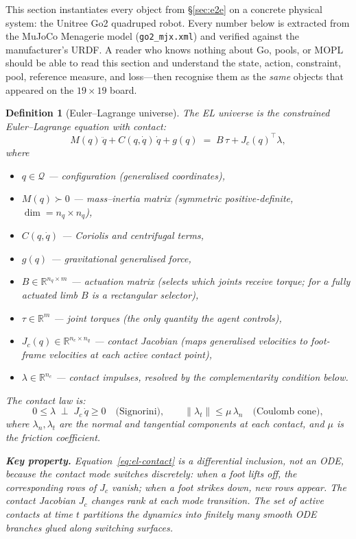 \documentclass[11pt,a4paper]{article}
\newtheorem{definition}[theorem]{Definition}
\newcommand{\R}{\mathbb{R}}
\newcommand{\norm}[1]{\lVert #1 \rVert}
\begin{document}
This section instantiates every object from
\S\ref{sec:e2e}
on a concrete physical system:
the Unitree Go2 quadruped robot.
Every number below is extracted from the
MuJoCo Menagerie model (\texttt{go2\_mjx.xml})
and verified against the manufacturer's URDF.
A reader who knows nothing about Go, pools, or MOPL
should be able to read this section and
understand the state, action, constraint, pool,
reference measure, and loss---then recognise them
as the \emph{same} objects that appeared on the $19\times 19$ board.


\begin{definition}[Euler--Lagrange universe]
\label{def:el-universe}
The \emph{EL universe} is the constrained
Euler--Lagrange equation with contact:
\begin{equation}\label{eq:el-contact}
  M(q)\,\ddot{q}
  + C(q,\dot{q})\,\dot{q}
  + g(q)
  \;=\;
  B\,\tau
  + J_c(q)^{\!\top}\lambda,
\end{equation}
where
\begin{itemize}[nosep]
\item $q \in \mathcal{Q}$ --- configuration
      (generalised coordinates),
\item $M(q) \succ 0$ --- mass--inertia matrix
      (symmetric positive-definite, $\dim = n_q \times n_q$),
\item $C(q,\dot{q})$ --- Coriolis and centrifugal terms,
\item $g(q)$ --- gravitational generalised force,
\item $B \in \R^{n_q \times m}$ --- actuation matrix
      (selects which joints receive torque;
       for a fully actuated limb $B$ is a rectangular selector),
\item $\tau \in \R^{m}$ --- joint torques
      (the \emph{only} quantity the agent controls),
\item $J_c(q) \in \R^{n_c \times n_q}$ --- contact Jacobian
      (maps generalised velocities to foot-frame velocities
       at each active contact point),
\item $\lambda \in \R^{n_c}$ --- contact impulses,
      resolved by the complementarity condition below.
\end{itemize}
The contact law is:
\begin{equation}\label{eq:contact-complementarity}
  0 \leq \lambda \;\perp\; J_c\,\dot{q} \geq 0
  \quad\text{(Signorini)},
  \qquad
  \norm{\lambda_t} \leq \mu\,\lambda_n
  \quad\text{(Coulomb cone)},
\end{equation}
where $\lambda_n, \lambda_t$ are the normal and tangential
components at each contact, and $\mu$ is the friction coefficient.

\medskip\noindent\textbf{Key property.}\;
Equation~\eqref{eq:el-contact} is a
\emph{differential inclusion}, not an ODE,
because the contact mode switches discretely:
when a foot lifts off, the corresponding rows of $J_c$
vanish; when a foot strikes down, new rows appear.
The contact Jacobian $J_c$ changes rank at each
mode transition.
The set of active contacts at time $t$ partitions
the dynamics into finitely many smooth ODE branches
glued along switching surfaces.
\end{definition}
\end{document}

